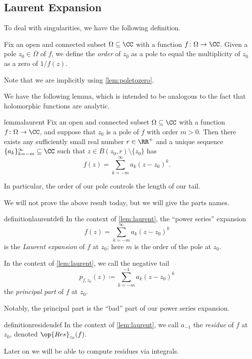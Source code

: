 \subsection{Laurent Expansion}
To deal with singularities, we have the following definition.
\begin{definition}[Order]
	Fix an open and connected subset $\Omega\subseteq\CC$ with a function $f\colon \Omega\to\CC$. Given a pole $z_0\in\overline\Omega$ of $f$, we define the \textit{order} of $z_0$ as a pole to equal the multiplicity of $z_0$ as a zero of $1/f(z)$.
\end{definition}
Note that we are implicitly using \autoref{lem:poletozero}.

We have the following lemma, which is intended to be analogous to the fact that holomorphic functions are analytic.
\begin{restatable}{lemma}{laurent} \label{lem:laurent}
	Fix an open and connected subset $\Omega\subseteq\CC$ with a function $f\colon \Omega\to\CC$, and suppose that $z_0$ is a pole of $f$ with order $m>0$. Then there exists any sufficiently small real number $r\in\RR^+$ and a unique sequence $\{a_k\}_{k=-m}^\infty\subseteq\CC$ such that $z\in B(z_0,r)\setminus\{z_0\}$ has
	\[f(z)=\sum_{k=-m}^\infty a_k(z-z_0)^k.\]
\end{restatable}
\noindent In particular, the order of our pole controls the length of our tail.

We will not prove the above result today, but we will give the parts names.
\begin{restatable}{definition}{laurentdefi}
	In the context of \autoref{lem:laurent}, the ``power series'' expansion
	\[f(z)=\sum_{k=-m}^\infty a_k(z-z_0)^k\]
	is the \textit{Laurent expansion} of $f$ at $z_0$; here $m$ is the order of the pole at $z_0$.
\end{restatable}
\begin{definition}
	In the context of \autoref{lem:laurent}, we call the negative tail
	\[p_{f,z_0}(z)\coloneqq \sum_{k=-m}^{-1}a_k(z-z_0)^k\]
	the \textit{principal part} of $f$ at $z_0$.
\end{definition}
Notably, the principal part is the ``bad'' part of our power series expansion.
\begin{restatable}[Residue]{definition}{resideudef}
	In the context of \autoref{lem:laurent}, we call $a_{-1}$ the \textit{residue} of $f$ at $z_0$, denoted $\op{Res}_{z_0}(f)$.
\end{restatable}
\noindent Later on we will be able to compute residues via integrals.